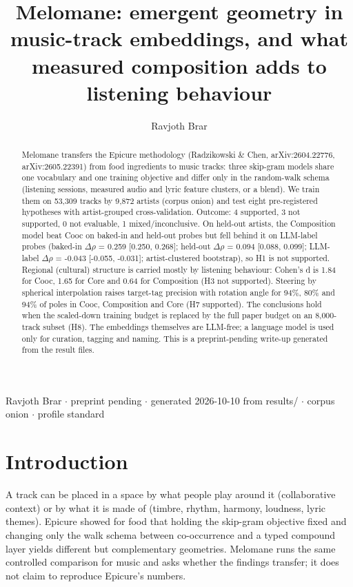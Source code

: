 \documentclass[11pt,a4paper]{article}
\title{\textbf{Melomane: emergent geometry in music-track embeddings, and what measured composition adds to listening behaviour}}
\author{Ravjoth Brar}
\date{}
\begin{document}
\maketitle
\begin{center}\small Ravjoth Brar $\cdot$ preprint pending $\cdot$ generated 2026-10-10 from results/ $\cdot$ corpus onion $\cdot$ profile standard\end{center}

\begin{abstract}
Melomane transfers the Epicure methodology (Radzikowski \& Chen, arXiv:2604.22776, arXiv:2605.22391) from food ingredients to music tracks: three skip-gram models share one vocabulary and one training objective and differ only in the random-walk schema (listening sessions, measured audio and lyric feature clusters, or a blend). We train them on 53,309 tracks by 9,872 artists (corpus onion) and test eight pre-registered hypotheses with artist-grouped cross-validation. Outcome: 4 supported, 3 not supported, 0 not evaluable, 1 mixed/inconclusive. On held-out artists, the Composition model beat Cooc on baked-in and held-out probes but fell behind it on LLM-label probes (baked-in $\Delta$$\rho$ = 0.259 [0.250, 0.268]; held-out $\Delta$$\rho$ = 0.094 [0.088, 0.099]; LLM-label $\Delta$$\rho$ = -0.043 [-0.055, -0.031]; artist-clustered bootstrap), so H1 is not supported. Regional (cultural) structure is carried mostly by listening behaviour: Cohen's d is 1.84 for Cooc, 1.65 for Core and 0.64 for Composition (H3 not supported). Steering by spherical interpolation raises target-tag precision with rotation angle for 94\%, 80\% and 94\% of poles in Cooc, Composition and Core (H7 supported). The conclusions hold when the scaled-down training budget is replaced by the full paper budget on an 8,000-track subset (H8). The embeddings themselves are LLM-free; a language model is used only for curation, tagging and naming. This is a preprint-pending write-up generated from the result files.

\end{abstract}

\section*{Introduction}
A track can be placed in a space by what people play around it (collaborative context) or by what it is made of (timbre, rhythm, harmony, loudness, lyric themes). Epicure showed for food that holding the skip-gram objective fixed and changing only the walk schema between co-occurrence and a typed compound layer yields different but complementary geometries. Melomane runs the same controlled comparison for music and asks whether the findings transfer; it does not claim to reproduce Epicure's numbers.
\end{document}
